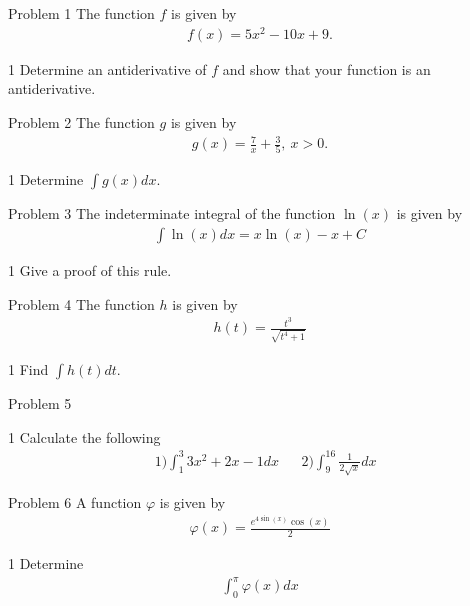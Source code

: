 \begin{opgavetekst}{Problem 1}
	The function $f$ is given by
	\begin{align*}
		f(x) = 5x^2 -10x + 9.
	\end{align*}
\end{opgavetekst}
\begin{delopgave}{1}
	Determine an antiderivative of $f$ and show that your function is an antiderivative.
\end{delopgave}

\begin{opgavetekst}{Problem 2}
	The function $g$ is given by
	\begin{align*}
		g(x) = \frac{7}{x} + \frac{3}{5}, \ x> 0.
	\end{align*}
\end{opgavetekst}
\begin{delopgave}{1}
	Determine $\int g(x) dx$.
\end{delopgave}

\begin{opgavetekst}{Problem 3}
	The indeterminate integral of the function $\ln(x)$ is given by
	\begin{align*}
		\int \ln(x) dx = x\ln(x) - x + C
	\end{align*}
\end{opgavetekst}
\begin{delopgave}{1}
	Give a proof of this rule. 
\end{delopgave}


\begin{opgavetekst}{Problem 4}
	The function $h$ is given by
	\begin{align*}
		h(t) = \frac{t^3}{\sqrt{t^4+1}}
	\end{align*}
\end{opgavetekst}
\begin{delopgave}{1}
	Find $\int h(t) dt$.
\end{delopgave}

\begin{opgavetekst}{Problem 5}	
\end{opgavetekst}
\begin{delopgave}{1}
	Calculate the following
	\begin{align*}
		&1) \int_1^3 3x^2+2x-1 dx & &2) \int_{9}^{16} \frac{1}{2\sqrt{x}} dx
	\end{align*}
\end{delopgave}

\begin{opgavetekst}{Problem 6}
	A function $\varphi$ is given by
	\begin{align*}
		\varphi(x) = \frac{e^{4\sin(x)}\cos(x)}{2}
	\end{align*}
\end{opgavetekst}
\begin{delopgave}{1}
	Determine 
	\begin{align*}
		\int_0^\pi \varphi(x) dx
	\end{align*}
\end{delopgave}

